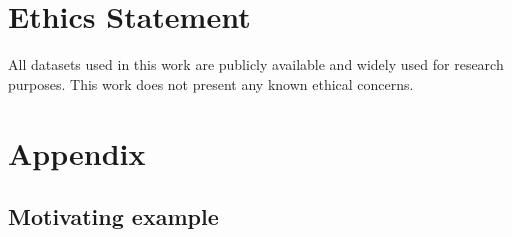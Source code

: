 \documentclass{article}
\theoremstyle{plain}
\theoremstyle{definition}
\theoremstyle{remark}
\begin{document}
\section*{Ethics Statement}
All datasets used in this work are publicly available and widely used for research purposes. This work does not present any known ethical concerns.






\newpage
\appendix
\onecolumn
\section{Appendix}
\label{supp}
\setcounter{section}{1}

\subsection{Motivating example}
\label{supp:example}
\end{document}
